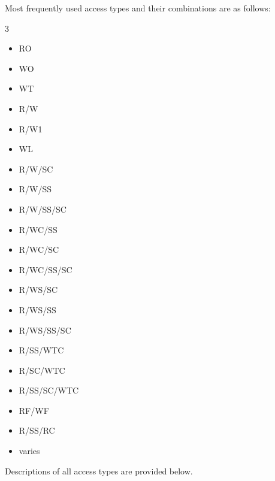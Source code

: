 Most frequently used access types and their combinations are as follows:

\begin{multicols}{3}
  \begin{itemize}
    \item RO
    \item WO
    \item WT
    \item R/W
    \item R/W1
    \item WL
    \item R/W/SC
    \item R/W/SS
    \item R/W/SS/SC
    \item R/WC/SS
    \item R/WC/SC
    \item R/WC/SS/SC
    \item R/WS/SC
    \item R/WS/SS
    \item R/WS/SS/SC
    \item R/SS/WTC
    \item R/SC/WTC
    \item R/SS/SC/WTC
    \item RF/WF
    \item R/SS/RC
    \item varies
  \end{itemize}
\end{multicols}

Descriptions of all access types are provided below.


